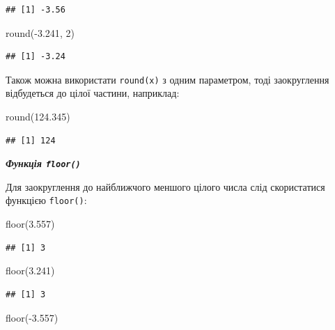 \documentclass[
]{book}
\newenvironment{Shaded}{\begin{snugshade}}{\end{snugshade}}
\newcommand{\DecValTok}[1]{\textcolor[rgb]{0.00,0.00,0.81}{#1}}
\newcommand{\FloatTok}[1]{\textcolor[rgb]{0.00,0.00,0.81}{#1}}
\newcommand{\FunctionTok}[1]{\textcolor[rgb]{0.00,0.00,0.00}{#1}}
\newcommand{\NormalTok}[1]{#1}
\newcommand{\SpecialCharTok}[1]{\textcolor[rgb]{0.00,0.00,0.00}{#1}}
\begin{document}
\begin{verbatim}
## [1] -3.56
\end{verbatim}

\begin{Shaded}
\begin{Highlighting}[]
\FunctionTok{round}\NormalTok{(}\SpecialCharTok{{-}}\FloatTok{3.241}\NormalTok{, }\DecValTok{2}\NormalTok{)}
\end{Highlighting}
\end{Shaded}

\begin{verbatim}
## [1] -3.24
\end{verbatim}

Також можна використати \texttt{round(x)} з одним параметром, тоді заокруглення відбудеться до цілої частини, наприклад:

\begin{Shaded}
\begin{Highlighting}[]
\FunctionTok{round}\NormalTok{(}\FloatTok{124.345}\NormalTok{)}
\end{Highlighting}
\end{Shaded}

\begin{verbatim}
## [1] 124
\end{verbatim}

\emph{\textbf{Функція \texttt{floor()}}}

Для заокруглення до найближчого меншого цілого числа слід скористатися функцією \texttt{floor()}:

\begin{Shaded}
\begin{Highlighting}[]
\FunctionTok{floor}\NormalTok{(}\FloatTok{3.557}\NormalTok{)}
\end{Highlighting}
\end{Shaded}

\begin{verbatim}
## [1] 3
\end{verbatim}

\begin{Shaded}
\begin{Highlighting}[]
\FunctionTok{floor}\NormalTok{(}\FloatTok{3.241}\NormalTok{)}
\end{Highlighting}
\end{Shaded}

\begin{verbatim}
## [1] 3
\end{verbatim}

\begin{Shaded}
\begin{Highlighting}[]
\FunctionTok{floor}\NormalTok{(}\SpecialCharTok{{-}}\FloatTok{3.557}\NormalTok{)}
\end{Highlighting}
\end{Shaded}
\end{document}
